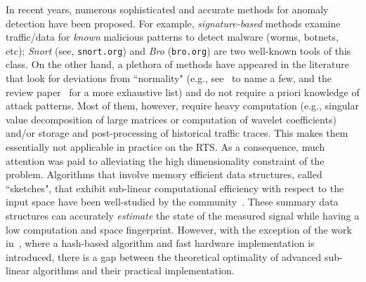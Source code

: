 \documentclass[10pt, conference, letterpaper,onecolumn]{IEEEtranv1.8}
\theoremstyle{plain}\newtheorem{thm}{Theorem}\newtheorem{lem}{Lemma}
\theoremstyle{definition}
\begin{document}
In  recent years, numerous sophisticated and accurate methods for anomaly detection have been proposed. For example,
\emph{signature-based} methods examine traffic/data for
\emph{known} malicious patterns to detect malware (worms, botnets, etc); \emph{Snort} (see, {\tt snort.org})  and \emph{Bro} 
({\tt bro.org}) are two well-known tools of this class.
On the other hand, 
a plethora of methods have appeared in the literature that look for deviations from ``normality" (e.g., see~\cite{Lakhina:2004:DNT:1030194.1015492, Barford:2002:SAN:637201.637210, Ide04eigenspace-basedanomaly, Zhang:2005:LAD:1080173.1080189}
to name a few, and the review paper~\cite{Thottan:2010:anmomaly:detection:review} for a more exhaustive list)
and do not require a priori knowledge of attack patterns.
Most of them, however, 
require heavy computation (e.g., singular value decomposition of large matrices or computation of wavelet coefficients) and/or storage and post-processing of historical 
traffic traces. This makes them essentially not applicable in practice on the RTS. 
As a consequence, much attention was paid to alleviating the high dimensionality constraint of the problem. Algorithms that involve
memory efficient data structures, called ``sketches", 
that exhibit sub-linear computational efficiency  with respect to the input space
have been well-studied by the community~\cite{Cormode:2005:IDS:1073713.1073718, Cormode:2003:FHH:1315451.1315492, Cormode:2004:HUS:1007568.1007575, Gilbert06algorithmiclinear, Krishnamurthy:2003:SCD:948205.948236, 4146856, 1354567, 2190032, Cormode1061325,  Porat:2012:STM:2095116.2095212, doi:10.1137/100816705}. These summary data structures
can accurately \emph{estimate} the 
state of the measured signal while having a low computation and space fingerprint.
However, with the  exception of the work in~\cite{4146856}, where a
hash-based algorithm and  fast 
hardware implementation is introduced, 
there is a  gap between the theoretical optimality of advanced sub-linear algorithms
and their practical implementation. 
\end{document}
